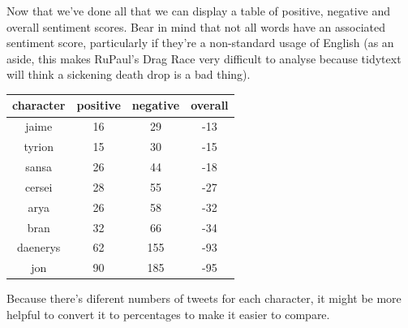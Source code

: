 \documentclass[]{book}
\newenvironment{Shaded}{\begin{snugshade}}{\end{snugshade}}
\newcommand{\DataTypeTok}[1]{\textcolor[rgb]{0.13,0.29,0.53}{#1}}
\newcommand{\KeywordTok}[1]{\textcolor[rgb]{0.13,0.29,0.53}{\textbf{#1}}}
\newcommand{\NormalTok}[1]{#1}
\newcommand{\OperatorTok}[1]{\textcolor[rgb]{0.81,0.36,0.00}{\textbf{#1}}}
\newcommand{\StringTok}[1]{\textcolor[rgb]{0.31,0.60,0.02}{#1}}
\begin{document}
Now that we've done all that we can display a table of positive, negative and overall sentiment scores. Bear in mind that not all words have an associated sentiment score, particularly if they're a non-standard usage of English (as an aside, this makes RuPaul's Drag Race very difficult to analyse because tidytext will think a sickening death drop is a bad thing).

\begin{Shaded}
\end{Shaded}

\begin{tabular}{c|c|c|c}
\hline
character & positive & negative & overall\\
\hline
jaime & 16 & 29 & -13\\
\hline
tyrion & 15 & 30 & -15\\
\hline
sansa & 26 & 44 & -18\\
\hline
cersei & 28 & 55 & -27\\
\hline
arya & 26 & 58 & -32\\
\hline
bran & 32 & 66 & -34\\
\hline
daenerys & 62 & 155 & -93\\
\hline
jon & 90 & 185 & -95\\
\hline
\end{tabular}

Because there's diferent numbers of tweets for each character, it might be more helpful to convert it to percentages to make it easier to compare.
\end{document}
